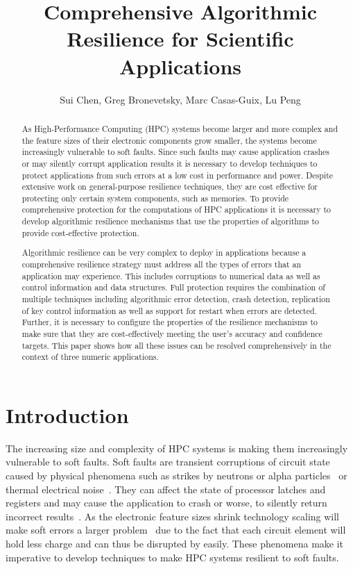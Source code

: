 \documentclass{sig-alternate}
\title{Comprehensive Algorithmic Resilience for Scientific Applications}
\author{Sui Chen, 
Greg Bronevetsky, Marc Casas-Guix,
Lu Peng
}
\begin{document}
\maketitle

\begin{abstract}
As High-Performance Computing (HPC) systems become larger and more complex and the feature sizes of their electronic components grow smaller, the systems become increasingly vulnerable to soft faults.
Since such faults may cause application crashes or may silently corrupt application results it is necessary to develop techniques to protect applications from such errors at a low cost in performance and power.
Despite extensive work on general-purpose resilience techniques, they are cost effective for protecting only certain system components, such as memories.
To provide comprehensive protection for the computations of HPC applications it is necessary to develop algorithmic resilience mechanisms that use the properties of algorithms to provide cost-effective protection.

Algorithmic resilience can be very complex to deploy in applications because a comprehensive resilience strategy must address all the types of errors that an application may experience.
This includes corruptions to numerical data as well as control information and data structures.
Full protection requires the combination of multiple techniques including algorithmic error detection, crash detection, replication of key control information as well as support for restart when errors are detected.
Further, it is necessary to configure the properties of the resilience mechanisms to make sure that they are cost-effectively meeting the user's accuracy and confidence targets.
This paper shows how all these issues can be resolved comprehensively in the context of three numeric applications.

\end{abstract}

\section{Introduction}
\label{sec:intro}

The increasing size and complexity of HPC systems is making them increasingly vulnerable to soft faults.
Soft faults are transient corruptions of circuit state caused by physical phenomena such as strikes by neutrons or alpha particles~\cite{baumann:2005, asciQSER:2005} or thermal electrical noise~\cite{therm_noise:2007}.
They can affect the state of processor latches and registers and may cause the application to crash or worse, to silently return incorrect results~\cite{mpi_ser:reed:2004}.
As the electronic feature sizes shrink technology scaling will make soft errors a larger problem~\cite{err_scaling:2012} due to the fact that each circuit element will hold less charge and can thus be disrupted by easily.
These phenomena make it imperative to develop techniques to make HPC systems resilient to soft faults.
\end{document}

